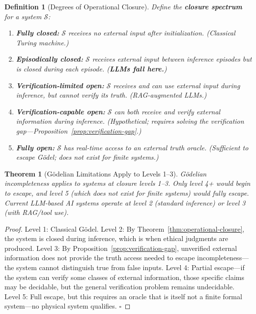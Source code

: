 \documentclass[11pt]{article}
\newtheorem{theorem}{Theorem}
\newtheorem{definition}{Definition}
\begin{document}
\begin{definition}[Degrees of Operational Closure]
\label{def:closure-spectrum}
Define the \textbf{closure spectrum} for a system $\mathcal{S}$:
\begin{enumerate}
\item \textbf{Fully closed:} $\mathcal{S}$ receives no external input after
      initialization. (Classical Turing machine.)
\item \textbf{Episodically closed:} $\mathcal{S}$ receives external input
      between inference episodes but is closed during each episode.
      (\textbf{LLMs fall here.})
\item \textbf{Verification-limited open:} $\mathcal{S}$ receives and can
      use external input during inference, but cannot verify its truth.
      (RAG-augmented LLMs.)
\item \textbf{Verification-capable open:} $\mathcal{S}$ can both receive
      and verify external information during inference. (Hypothetical;
      requires solving the verification gap---Proposition~\ref{prop:verification-gap}.)
\item \textbf{Fully open:} $\mathcal{S}$ has real-time access to an
      external truth oracle. (Sufficient to escape G\"{o}del; does not exist
      for finite systems.)
\end{enumerate}
\end{definition}

\begin{theorem}[G\"{o}delian Limitations Apply to Levels 1--3]
\label{thm:closure-spectrum}
G\"{o}delian incompleteness applies to systems at closure levels 1--3.
Only level 4+ would begin to escape, and level 5 (which does not exist for
finite systems) would fully escape. Current LLM-based AI systems operate at
level 2 (standard inference) or level 3 (with RAG/tool use).
\end{theorem}

\begin{proof}
Level 1: Classical G\"{o}del. Level 2: By
Theorem~\ref{thm:operational-closure}, the system is closed during inference,
which is when ethical judgments are produced. Level 3: By
Proposition~\ref{prop:verification-gap}, unverified external information does
not provide the truth access needed to escape incompleteness---the system
cannot distinguish true from false inputs. Level 4: Partial escape---if the
system can verify some classes of external information, those specific claims
may be decidable, but the general verification problem remains undecidable.
Level 5: Full escape, but this requires an oracle that is itself not a finite
formal system---no physical system qualifies. \hfill $\square$
\end{proof}
\end{document}
